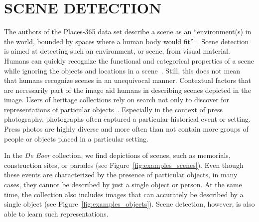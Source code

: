 \documentclass[a4paper,twoside]{article}
\begin{document}
\section{SCENE DETECTION}
\label{sec:scene_detection}
\noindent The authors of the Places-365 data set describe a scene as an ``environment(s) in the world, bounded by spaces where a human body would fit''~\cite{zhou_places_2018}. 
Scene detection is aimed at detecting such an environment, or scene, from visual material. 
Humans can quickly recognize the functional and categorical properties of a scene while ignoring the objects and locations in a scene~\cite{oliva_modeling_2001}. 
Still, this does not mean that humans recognize scenes in an unequivocal manner. 
Contextual factors that are necessarily part of the image aid humans in describing scenes depicted in the image.  
Users of heritage collections rely on search not only to discover for representations of particular objects~\cite{petras2017europeana,clough2017europeana}.
Especially in the context of press photography, photographs often captured a particular historical event or setting.
Press photos are highly diverse and more often than not contain more groups of people or objects placed in a particular setting.

In the \emph{De Boer} collection, we find depictions of scenes, such as memorials, construction sites, or parades (see Figure~\ref{fig:examples_scenes}). 
Even though these events are characterized by the presence of particular objects, in many cases, they cannot be described by just a single object or person.
%
At the same time, the collection also includes images that can accurately be described by a single object (see Figure~\ref{fig:examples_objects}). 
Scene detection, however, is also able to learn such representations. 
\end{document}
